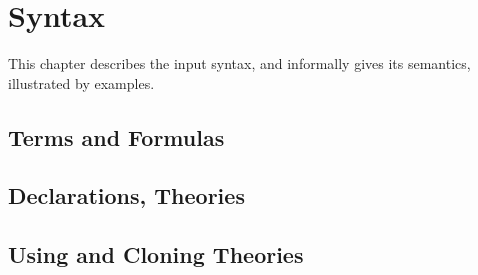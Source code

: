 \chapter{Syntax}
\label{chap:syntax}

This chapter describes the input syntax, and informally gives its semantics,
illustrated by examples.

\section{Terms and Formulas}

\section{Declarations, Theories}

\section{Using and Cloning Theories}

